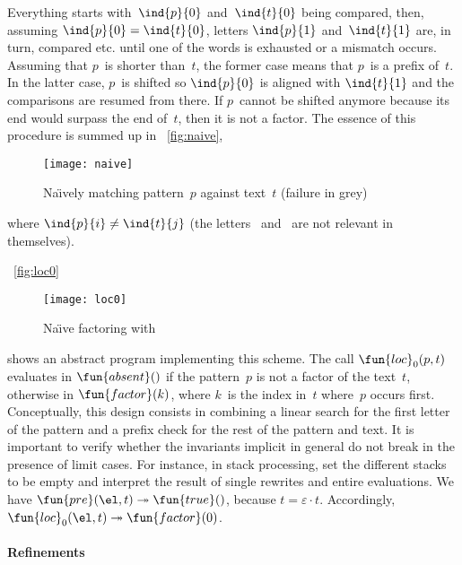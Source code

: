 Everything starts with~\(\ind{p}{0}\) and~\(\ind{t}{0}\) being
compared, then, assuming \(\ind{p}{0} = \ind{t}{0}\), letters
\(\ind{p}{1}\) and~\(\ind{t}{1}\) are, in turn, compared etc. until
one of the words is exhausted or a mismatch occurs. Assuming that
\(p\)~is shorter than~\(t\), the former case means that \(p\)~is a
prefix of~\(t\). In the latter case, \(p\)~is shifted so
\(\ind{p}{0}\) is aligned with \(\ind{t}{1}\) and the comparisons are
resumed from there. If \(p\)~cannot be shifted anymore because its end
would surpass the end of~\(t\), then it is not a factor. The essence
of this procedure is summed up in \fig~\vref{fig:naive},
\begin{figure}[t]
\centering
\texttt{[image: naive]}
\caption{Na\"{\i}vely matching pattern~\(p\) against text~\(t\)
  (failure in grey)}
\label{fig:naive}
\end{figure}
where \(\ind{p}{i} \neq \ind{t}{j}\) (the letters
~and~ are not relevant in themselves).

%

\Fig~\vref{fig:loc0}
\begin{figure}[t]
\centering
\texttt{[image: loc0]}
\caption{Na\"{\i}ve factoring with }
\label{fig:loc0}
\end{figure}
shows an abstract program implementing this scheme. The call
\(\fun{loc}_0(p,t)\) evaluates in
\(\fun{absent}()\) if the pattern~\(p\) is not a factor of the
text~\(t\), otherwise in \(\fun{factor}(k)\), where \(k\)~is the index
in~\(t\) where~\(p\) occurs first. Conceptually, this design consists
in combining a linear search for the first letter of the pattern and a
prefix check for the rest of the pattern and text. It is important to
verify whether the invariants implicit in general do not break in the
presence of limit cases. For instance, in stack processing, set the
different stacks to be empty and interpret the result of single
rewrites and entire evaluations. We have \(\fun{pre}(\el,t)
\twoheadrightarrow \fun{true}()\), because \(t = \varepsilon \cdot
t\). Accordingly, \(\fun{loc}_0(\el,t) \twoheadrightarrow
\fun{factor}(0)\).

\paragraph{Refinements}

